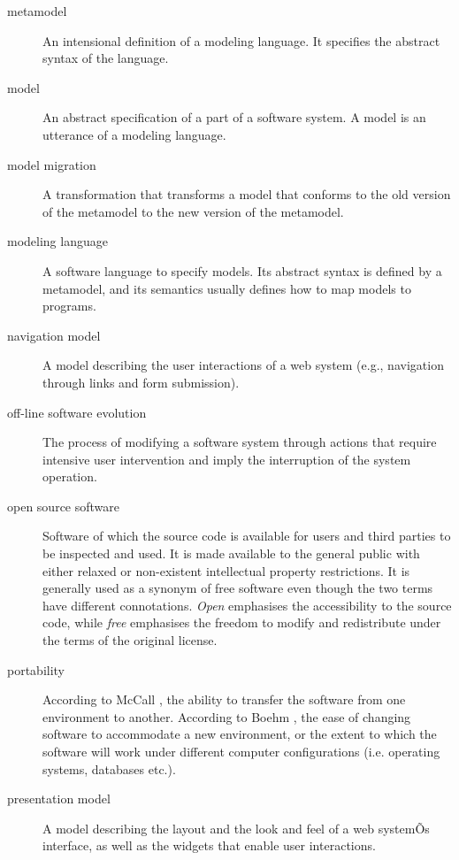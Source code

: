 \documentclass[11pt, oneside]{article}
\begin{document}
\begin{description}
\item[metamodel]
An intensional definition of a modeling language. It specifies the abstract syntax of the language.

\item[model]
An abstract specification of a part of a software system. A model is an utterance of a modeling language.

\item[model migration]
A transformation that transforms a model that conforms to the old version of the metamodel to the new version of the metamodel.


\item[modeling language]
A software language to specify models. Its abstract syntax is defined by a metamodel, and its semantics usually defines how to map models to programs.


\item[navigation model]
A model describing the user interactions of a web system (e.g., navigation through links and form submission).


\item[off-line software evolution]
The process of modifying a software system through actions that require intensive user intervention and imply the interruption of the system operation.

\item[open source software]
Software of which the source code is available for users and third parties to be inspected and used. It is made available to the general public with either relaxed or non-existent intellectual property restrictions.
 It is generally used as a synonym of free software even though the two terms have different connotations. \emph{Open} emphasises the accessibility to the source code, while \emph{free} emphasises the freedom to modify and redistribute under the terms of the original license.


\item[portability]
According to McCall \cite{mccall1977factors}, the ability to transfer the software from one environment to another.
According to Boehm \cite{opac-b1104886}, the ease of changing software to accommodate a new environment, or the extent to which the software will work under different computer configurations (i.e. operating systems, databases etc.).

\item[presentation model]
A model describing the layout and the look and feel of a web systemÕs interface, as well as the widgets that enable user interactions.


\end{description}
\end{document}
